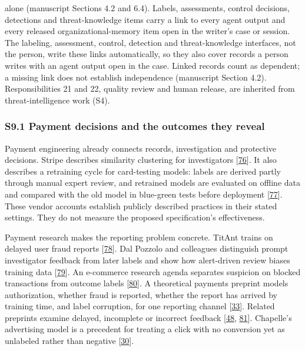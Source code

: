 \documentclass[
  11pt,
]{article}
\begin{document}
\begin{table}[!tp]
{\begin{tabular}
alone (manuscript Sections 4.2 and 6.4). Labels, assessments, control
decisions, detections and threat-knowledge items carry a link to every
agent output and every released organizational-memory item open in the
writer's case or session. The labeling, assessment, control, detection
and threat-knowledge interfaces, not the person, write these links
automatically, so they also cover records a person writes with an agent
output open in the case. Linked records count as dependent; a missing
link does not establish independence (manuscript Section 4.2).
Responsibilities 21 and 22, quality review and human release, are
inherited from threat-intelligence work (S4). \\

\bottomrule\noalign{}
\end{tabular}
}
\end{table}

\hypertarget{s9.1-payment-decisions-and-the-outcomes-they-reveal}{%
\subsubsection{S9.1 Payment decisions and the outcomes they
reveal}\label{s9.1-payment-decisions-and-the-outcomes-they-reveal}}

Payment engineering already connects records, investigation and
protective decisions. Stripe describes similarity clustering for
investigators {[}\protect\hyperlink{ref-Tausz2020}{76}{]}. It also
describes a retraining cycle for card-testing models: labels are derived
partly through manual expert review, and retrained models are evaluated
on offline data and compared with the old model in blue-green tests
before deployment {[}\protect\hyperlink{ref-Drapeau2024}{77}{]}. These
vendor accounts establish publicly described practices in their stated
settings. They do not measure the proposed specification's
effectiveness.

Payment research makes the reporting problem concrete. TitAnt trains on
delayed user fraud reports
{[}\protect\hyperlink{ref-Cao2019TitAnt}{78}{]}. Dal Pozzolo and
colleagues distinguish prompt investigator feedback from later labels
and show how alert-driven review biases training data
{[}\protect\hyperlink{ref-DalPozzolo2017Fraud}{79}{]}. An e-commerce
research agenda separates suspicion on blocked transactions from outcome
labels {[}\protect\hyperlink{ref-Tax2021Fraud}{80}{]}. A theoretical
payments preprint models authorization, whether fraud is reported,
whether the report has arrived by training time, and label corruption,
for one reporting channel
{[}\protect\hyperlink{ref-Dhama2026Causal}{33}{]}. Related preprints
examine delayed, incomplete or incorrect feedback
{[}\protect\hyperlink{ref-Dhama2026Limits}{48},
\protect\hyperlink{ref-HeLoh2026Grab}{81}{]}. Chapelle's advertising
model is a precedent for treating a click with no conversion yet as
unlabeled rather than negative
{[}\protect\hyperlink{ref-Chapelle2014Delayed}{30}{]}.
\end{document}
